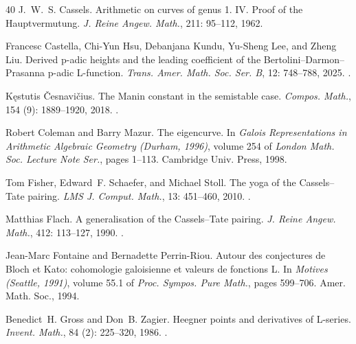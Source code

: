 \documentclass[11pt]{article}
\theoremstyle{definition}
\begin{document}
\begin{thebibliography}{40}
J.~W.~S. Cassels.
\newblock Arithmetic on curves of genus 1. {IV}. {Proof} of the {Hauptvermutung}.
\newblock \emph{J. Reine Angew. Math.}, 211: 95--112, 1962.

Francesc Castella, Chi-Yun Hsu, Debanjana Kundu, Yu-Sheng Lee, and Zheng Liu.
\newblock Derived p-adic heights and the leading coefficient of the {Bertolini--Darmon--Prasanna} p-adic {L}-function.
\newblock \emph{Trans. Amer. Math. Soc. Ser. B}, 12: 748--788, 2025.
\newblock {}.

K{\k{e}}stutis {\v{C}}esnavi{\v{c}}ius.
\newblock The {Manin} constant in the semistable case.
\newblock \emph{Compos. Math.}, 154 (9): 1889--1920, 2018.
\newblock {}.

Robert Coleman and Barry Mazur.
\newblock The eigencurve.
\newblock In \emph{Galois Representations in Arithmetic Algebraic Geometry ({Durham}, 1996)}, volume 254 of \emph{London Math. Soc. Lecture Note Ser.}, pages 1--113. Cambridge Univ. Press, 1998.

Tom Fisher, Edward~F. Schaefer, and Michael Stoll.
\newblock The yoga of the {Cassels--Tate} pairing.
\newblock \emph{LMS J. Comput. Math.}, 13: 451--460, 2010.
\newblock {}.

Matthias Flach.
\newblock A generalisation of the {Cassels--Tate} pairing.
\newblock \emph{J. Reine Angew. Math.}, 412: 113--127, 1990.
\newblock {}.

Jean-Marc Fontaine and Bernadette Perrin-Riou.
\newblock Autour des conjectures de {Bloch} et {Kato}: cohomologie galoisienne et valeurs de fonctions {L}.
\newblock In \emph{Motives ({Seattle}, 1991)}, volume 55.1 of \emph{Proc. Sympos. Pure Math.}, pages 599--706. Amer. Math. Soc., 1994.

Benedict~H. Gross and Don~B. Zagier.
\newblock Heegner points and derivatives of {L}-series.
\newblock \emph{Invent. Math.}, 84 (2): 225--320, 1986.
\newblock {}.


\end{thebibliography}
\end{document}
